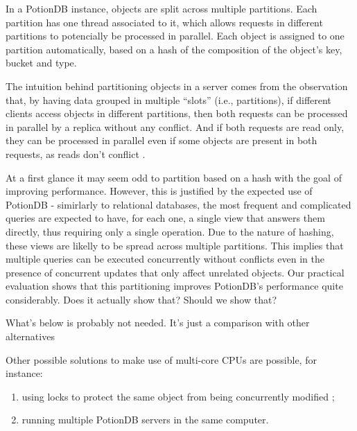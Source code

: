 \documentclass{vldb}
\newcommand{\grumbler}[2]{{\color{red}{\bf #1:} #2}}
\newcommand{\andre}[1]{\grumbler{andre}{#1}}
\begin{document}
In a PotionDB instance, objects are split across multiple partitions.
Each partition has one thread associated to it, which allows requests in different partitions to potencially be processed in parallel. 
Each object is assigned to one partition automatically, based on a hash of the composition of the object's key, bucket and type.

The intuition behind partitioning objects in a server comes from the observation that, by having data grouped in multiple ``slots'' (i.e., partitions), if different clients access objects in different partitions, then both requests can be processed in parallel by a replica without any conflict.
And if both requests are read only, they can be processed in parallel even if some objects are present in both requests, as reads don't conflict \cite{???}.

At a first glance it may seem odd to partition based on a hash with the goal of improving performance.
However, this is justified by the expected use of PotionDB - simirlarly to relational databases, the most frequent and complicated queries are expected to have, for each one, a single view that answers them directly, thus requiring only a single operation.
Due to the nature of hashing, these views are likelly to be spread across multiple partitions.
This implies that multiple queries can be executed concurrently without conflicts even in the presence of concurrent updates that only affect unrelated objects.
Our practical evaluation shows that this partitioning improves PotionDB's performance quite considerably. \andre{Does it actually show that? Should we show that?}

\andre{What's below is probably not needed. It's just a comparison with other alternatives}

Other possible solutions to make use of multi-core CPUs are possible, for instance:
\begin{enumerate}
	\item \label{item:locks} using locks to protect the same object from being concurrently modified \cite{???};
	\item \label{item:multiplePotion} running multiple PotionDB servers in the same computer.
\end{enumerate}
\end{document}
